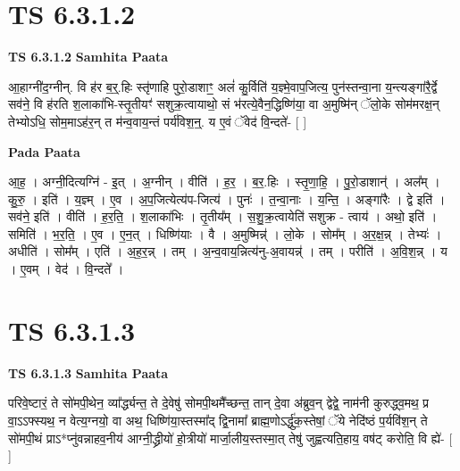 \documentclass[17pt]{extarticle}
\begin{document}

\section{ TS 6.3.1.2 }

\textbf{TS 6.3.1.2 } \newline
\textbf{Samhita Paata} \newline

आ॒हाग्नी॑द॒ग्नीन्. वि ह॑र ब॒र्॒.हिः स्तृ॑णाहि पुरो॒डाशाꣳ॒॒ अलं॑ कु॒र्विति॑ य॒ज्ञ्मे॒वाप॒जित्य॒ पुन॑स्तन्वा॒ना य॒न्त्यङ्गा॑रै॒र्द्वे सव॑ने॒ वि ह॑रति श॒लाका॑भि-स्तृ॒तीयꣳ॑ सशुक्र॒त्वायाथो॒ सं भ॑रत्ये॒वैन॒द्धिष्णि॑या॒ वा अ॒मुष्मि॑न् ॅलो॒के सोम॑मरक्ष॒न् तेभ्योऽधि॒ सोम॒माऽह॑र॒न् त म॑न्व॒वाय॒न्तं पर्य॑विश॒न्॒. य ए॒वं ॅवेद॑ वि॒न्दते॑- [  ] \newline

\textbf{Pada Paata} \newline

आ॒ह॒ । अग्नी॒दित्यग्नि॑ - इ॒त् । अ॒ग्नीन् । वीति॑ । ह॒र॒ । ब॒र॒.हिः । स्तृ॒णा॒हि॒ । पु॒रो॒डाशान्॑ । अल᳚म् । कु॒रु॒ । इति॑ । य॒ज्ञ्म् । ए॒व । अ॒प॒जित्येत्य॑प-जित्य॑ । पुनः॑ । त॒न्वा॒नाः । य॒न्ति॒ । अङ्गा॑रैः । द्वे इति॑ । सव॑ने॒ इति॑ । वीति॑ । ह॒र॒ति॒ । श॒लाका॑भिः । तृ॒तीय᳚म् । स॒शु॒क्र॒त्वायेति॑ सशुक्र - त्वाय॑ । अथो॒ इति॑ । समिति॑ । भ॒र॒ति॒ । ए॒व । ए॒न॒त् । धिष्णि॑याः । वै । अ॒मुष्मिन्न्॑ । लो॒के । सोम᳚म् । अ॒र॒क्ष॒न्न् । तेभ्यः॑ । अधीति॑ । सोम᳚म् । एति॑ । अ॒ह॒र॒न्न् । तम् । अ॒न्व॒वाय॒न्नित्य॑नु-अ॒वायन्न्॑ । तम् । परीति॑ । अ॒वि॒श॒न्न् । य । ए॒वम् । वेद॑ । वि॒न्दते᳚ ।  \newline





\section{ TS 6.3.1.3 }

\textbf{TS 6.3.1.3 } \newline
\textbf{Samhita Paata} \newline

परिवे॒ष्टारं॒ ते सो॑मपी॒थेन॒ व्या᳚र्द्ध्यन्त॒ ते दे॒वेषु॑ सोमपी॒थमै᳚च्छन्त॒ तान् दे॒वा अ॑ब्रुव॒न् द्वेद्वे॒ नाम॑नी कुरुद्ध्व॒मथ॒ प्र वा॒ऽऽफ्स्यथ॒ न वेत्य॒ग्नयो॒ वा अथ॒ धिष्णि॑या॒स्तस्मा᳚द् द्वि॒नामा᳚ ब्राह्म॒णोऽर्द्धु॑क॒स्तेषां॒ ॅये नेदि॑ष्ठं प॒र्यवि॑श॒न् ते सो॑मपी॒थं प्राऽ*प्नु॑वन्नाहव॒नीय॑ आग्नी॒द्ध्रीयो॑ हो॒त्रीयो॑ मार्जा॒लीय॒स्तस्मा॒त् तेषु॑ जुह्वत्यति॒हाय॒ वष॑ट् करोति॒ वि ह्ये॑- [  ] \newline
\end{document}

